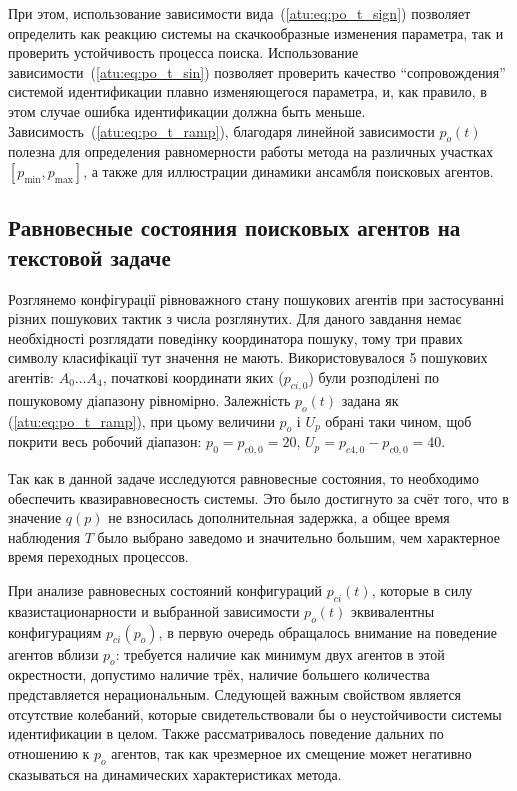 При этом, использование зависимости вида~(\ref{atu:eq:po_t_sign})
позволяет определить как реакцию системы на скачкообразные
изменения параметра, так и проверить устойчивость процесса поиска.
Использование зависимости~(\ref{atu:eq:po_t_sin}) позволяет проверить
качество ``сопровождения'' системой идентификации плавно изменяющегося параметра,
и, как правило, в этом случае ошибка идентификации должна быть меньше.
Зависимость~(\ref{atu:eq:po_t_ramp}), благодаря линейной зависимости $p_o(t)$
полезна для определения
равномерности работы метода на различных участках $[p_{\min}, p_{\max}]$,
а также для иллюстрации динамики ансамбля поисковых агентов.



\subsection{Равновесные состояния поисковых агентов на текстовой задаче}  %

Розглянемо конфігурації рівноважного стану пошукових агентів при застосуванні
різних пошукових тактик з числа розглянутих. Для даного завдання немає
необхідності розглядати поведінку координатора пошуку, тому три правих символу
класифікації тут значення не мають.
Використовувалося 5 пошукових агентів: $A_0 \ldots A_4$, початкові
координати яких ($p_{ci,0}$) були розподілені по пошуковому діапазону
рівномірно. Залежність $p_o (t)$ задана як (\ref{atu:eq:po_t_ramp}), при
цьому величини $p_o$ і $U_p$ обрані таки чином, щоб покрити весь робочий
діапазон: $p_0 = p_{c0,0} = 20$, $U_p = p_{c4,0} - p_{c0,0} = 40$.

Так как в данной задаче исследуются равновесные состояния, то
необходимо обеспечить квазиравновесность системы.
Это было достигнуто за счёт того, что
в значение $q(p)$ не взносилась дополнительная задержка,
а общее время наблюдения $T$ было выбрано заведомо и значительно большим,
чем характерное время переходных процессов.

При анализе равновесных состояний конфигураций $p_{ci}(t)$,
которые в силу квазистационарности и выбранной зависимости $p_o(t)$
эквивалентны конфигурациям $p_{ci}(p_o)$,
в первую очередь обращалось внимание на поведение агентов
вблизи $p_o$: требуется наличие как минимум двух агентов в этой окрестности,
допустимо наличие трёх, наличие большего количества представляется нерациональным.
Следующей важным свойством является отсутствие колебаний,
которые свидетельствовали бы о неустойчивости системы идентификации в целом.
Также рассматривалось поведение дальних по отношению к $p_o$
агентов, так как чрезмерное их смещение может негативно
сказываться на динамических характеристиках метода.

